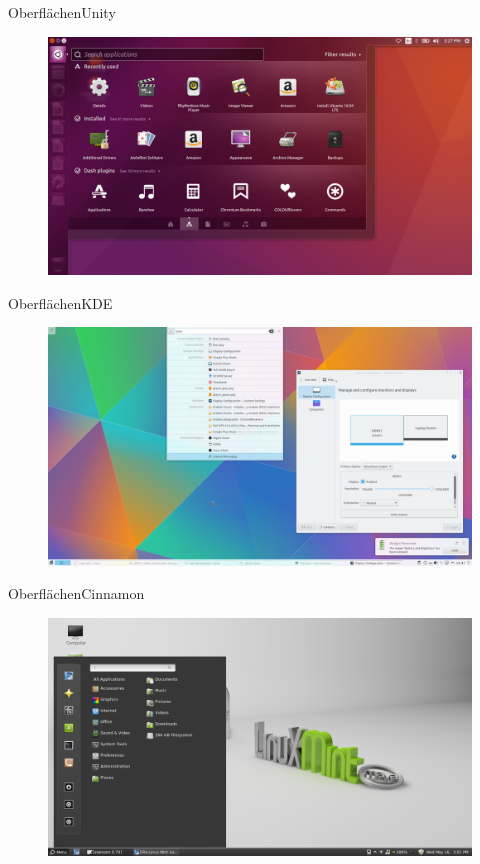 \begin{frame}{Oberflächen}{Unity}

\begin{figure}
 \includegraphics[height=0.6\textheight]{resources/1200px-App_Lens_on_Ubuntu.png}
 \end{figure}
\end{frame}

\begin{frame}{Oberflächen}{KDE}

\begin{figure}
 \includegraphics[height=0.6\textheight]{resources/1200px-Kscreen-krunner.png}
 \end{figure}


\end{frame}

\begin{frame}{Oberflächen}{Cinnamon}
\begin{figure}
 \includegraphics[height=0.6\textheight]{resources/1200px-Linux_Mint.png}
 \end{figure}


\end{frame}


 





